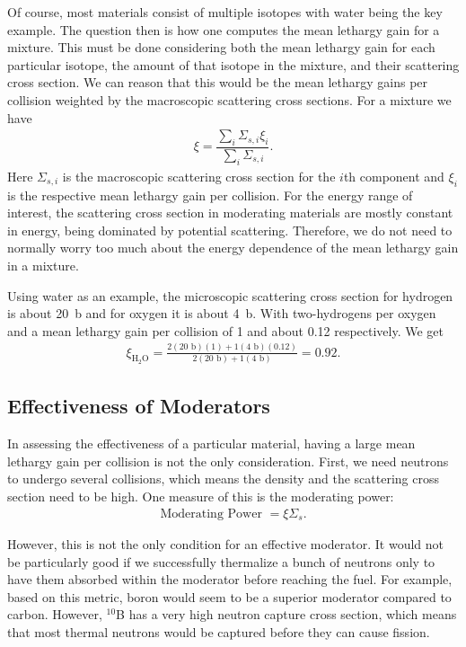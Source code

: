 Of course, most materials consist of multiple isotopes with water being the key example. The question then is how one computes the mean lethargy gain for a mixture. This must be done considering both the mean lethargy gain for each particular isotope, the amount of that isotope in the mixture, and their scattering cross section. We can reason that this would be the mean lethargy gains per collision weighted by the macroscopic scattering cross sections. For a mixture we have
\begin{align}
  \xi = \dfrac{ \displaystyle\sum_i \Sigma_{s,i} \xi_i }{  \displaystyle\sum_i \Sigma_{s,i} } . \label{Eq:thermalization_meanLethargyGainMixture}
\end{align} 
Here $\Sigma_{s,i}$ is the macroscopic scattering cross section for the $i$th component and $\xi_i$ is the respective mean lethargy gain per collision. For the energy range of interest, the scattering cross section in moderating materials are mostly constant in energy, being dominated by potential scattering. Therefore, we do not need to normally worry too much about the energy dependence of the mean lethargy gain in a mixture.

Using water as an example, the microscopic scattering cross section for hydrogen is about 20~b and for oxygen it is about 4~b. With two-hydrogens per oxygen and a mean lethargy gain per collision of 1 and about 0.12 respectively. We get
\begin{align}
  \xi_{\text{H$_2$O}} = \frac{ 2 ( 20 \text{ b}) ( 1 ) + 1 ( 4 \text{ b} ) ( 0.12 ) }{ 2 ( 20 \text{ b}) + 1 ( 4 \text{ b} ) } = 0.92. \nonumber
\end{align} 

\subsection{Effectiveness of Moderators}

In assessing the effectiveness of a particular material, having a large mean lethargy gain per collision is not the only consideration. First, we need neutrons to undergo several collisions, which means the density and the scattering cross section need to be high. One measure of this is the moderating power:
\begin{align}
  \text{Moderating Power } = \xi \Sigma_s .
\end{align}

However, this is not the only condition for an effective moderator. It would not be particularly good if we successfully thermalize a bunch of neutrons only to have them absorbed within the moderator before reaching the fuel. For example, based on this metric, boron would seem to be a superior moderator compared to carbon. However, $^{10}$B has a very high neutron capture cross section, which means that most thermal neutrons would be captured before they can cause fission. 

